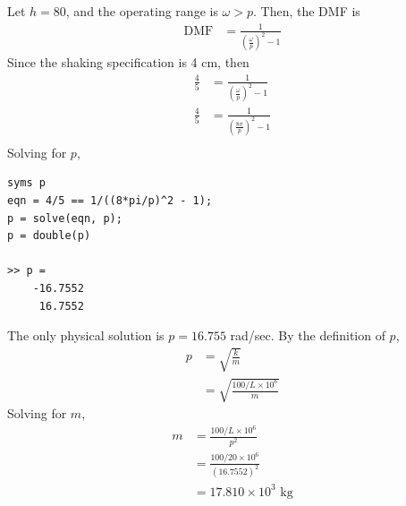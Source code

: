 \subsection{}
Let $h = 80$, and the operating range is $\omega > p$. Then, the DMF is
\begin{align*}
    \text{DMF} &= \frac{1}{\left(\frac{\omega}{p}\right)^2 - 1}
\end{align*}
Since the shaking specification is 4 cm, then
\begin{align*}
    \frac{4}{5} &= \frac{1}{\left(\frac{\omega}{p}\right)^2 - 1} \\
    \frac{4}{5} &= \frac{1}{\left(\frac{8\pi}{p}\right)^2 - 1} \\
\end{align*}
Solving for $p$, 
\begin{verbatim}
syms p
eqn = 4/5 == 1/((8*pi/p)^2 - 1);
p = solve(eqn, p);
p = double(p)

>> p =
    -16.7552
     16.7552
\end{verbatim}
The only physical solution is $p = 16.755$ rad/sec.
By the definition of $p$,
\begin{align*}
    p &= \sqrt{\frac{k}{m}} \\
    &= \sqrt{\frac{100/L \times 10^6}{m}} 
\end{align*}
Solving for $m$,
\begin{align*}
    m &= \frac{100/L \times 10^6}{p^2} \\
    &= \frac{100/20 \times 10^6}{(16.7552)^2} \\
    &= \boxed{17.810 \times 10^3 \text{ kg}}
\end{align*}
